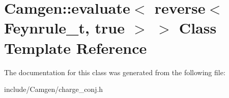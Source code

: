 \hypertarget{a00180}{\section{Camgen\-:\-:evaluate$<$ reverse$<$ Feynrule\-\_\-t, true $>$ $>$ Class Template Reference}
\label{a00180}
}


The documentation for this class was generated from the following file\-:\begin{DoxyCompactItemize}
\item 
include/\-Camgen/charge\-\_\-conj.\-h\end{DoxyCompactItemize}
